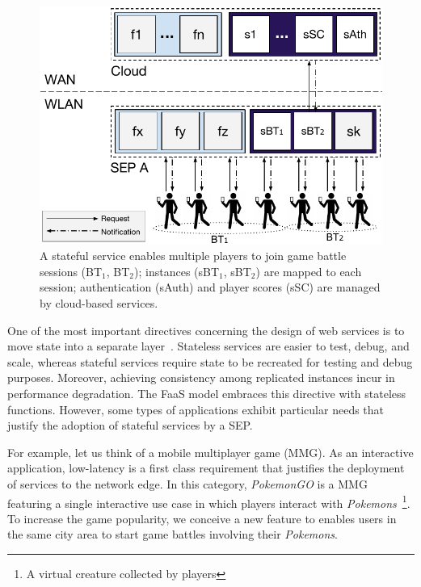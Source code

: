 \begin{figure}[bp]
	\centering
	\includegraphics[width=\linewidth]{Figs/Stateful_Edge_Services.pdf}
	\caption{A stateful service enables multiple players to join game battle sessions (BT$_1$, BT$_2$); instances (sBT$_1$, sBT$_2$) are mapped to each session; authentication (sAuth) and player scores (sSC) are managed by cloud-based services.}
	\label{fig:Steteful_Edge_MMG}
\end{figure}

One of the most important directives concerning the design of web services is to move state into a separate layer~\cite{Armbrust:2010}. Stateless services are easier to test, debug, and scale, whereas stateful services require state to be recreated for testing and debug purposes. Moreover, achieving consistency among replicated instances incur in performance degradation. The FaaS model embraces this directive with stateless functions.
However, some types of applications exhibit particular needs that justify the adoption of stateful services by a SEP.

For example, let us think of a mobile multiplayer game (MMG). As an interactive application, low-latency is a first class requirement that justifies the deployment of services to the network edge. In this category, \textit{PokemonGO} is 
a MMG featuring a single interactive use case in which players interact with \textit{Pokemons}~\footnote{A virtual creature collected by players}.
To increase the game popularity, we conceive a new feature to enables users in the same city area to start game battles involving their \textit{Pokemons}. 


